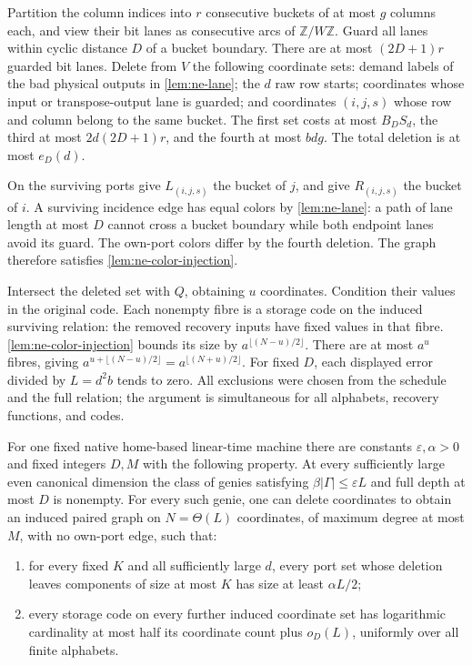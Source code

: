 \begin{informalproof}
Partition the column indices into $r$ consecutive buckets of at most $g$
columns each, and view their bit lanes as consecutive arcs of
$\mathbb Z/W\mathbb Z$.  Guard all lanes within cyclic distance $D$ of
a bucket boundary.  There are at most $(2D+1)r$ guarded bit lanes.
Delete from $V$ the following coordinate sets: demand labels of the bad
physical outputs in \cref{lem:ne-lane}; the $d$ raw row starts; coordinates
whose input or transpose-output lane is guarded; and coordinates $(i,j,s)$
whose row and column belong to the same bucket.  The first set costs at
most $B_DS_d$, the third at most $2d(2D+1)r$, and the fourth at most $bdg$.
The total deletion is at most $e_D(d)$.

On the surviving ports give $L_{(i,j,s)}$ the bucket of $j$, and give
$R_{(i,j,s)}$ the bucket of $i$.  A surviving incidence edge has equal
colors by \cref{lem:ne-lane}: a path of lane length at most $D$ cannot
cross a bucket boundary while both endpoint lanes avoid its guard.
The own-port colors differ by the fourth deletion.  The graph therefore
satisfies \cref{lem:ne-color-injection}.

Intersect the deleted set with $Q$, obtaining $u$ coordinates.  Condition
their values in the original code.  Each nonempty fibre is a storage code
on the induced surviving relation: the removed recovery inputs have fixed
values in that fibre.  \cref{lem:ne-color-injection} bounds its size by
$a^{\lfloor(N-u)/2\rfloor}$.  There are at most $a^u$ fibres, giving
$a^{u+\lfloor(N-u)/2\rfloor}=a^{\lfloor(N+u)/2\rfloor}$.
For fixed $D$, each displayed error divided by $L=d^2b$ tends to zero.
All exclusions were chosen from the schedule and the full relation; the
argument is simultaneous for all alphabets, recovery functions, and codes.
\end{informalproof}

\begin{corollary}
\notformalized
\label{cor:ne-combined}
For one fixed native home-based linear-time machine there are constants
$\varepsilon,\alpha>0$ and fixed integers $D,M$ with the following
property.  At every sufficiently large even canonical dimension the class
of genies satisfying $\beta|\Gamma|\le\varepsilon L$ and full depth at
most $D$ is nonempty.  For every such genie, one can delete coordinates
to obtain an induced paired graph on $N=\Theta(L)$ coordinates, of maximum
degree at most $M$, with no own-port edge, such that:
\begin{enumerate}
\item for every fixed $K$ and all sufficiently large $d$, every port set
whose deletion leaves components of size at most $K$ has size at least
$\alpha L/2$;
\item every storage code on every further induced coordinate set has
logarithmic cardinality at most half its coordinate count plus $o_D(L)$,
uniformly over all finite alphabets.
\end{enumerate}
\end{corollary}


